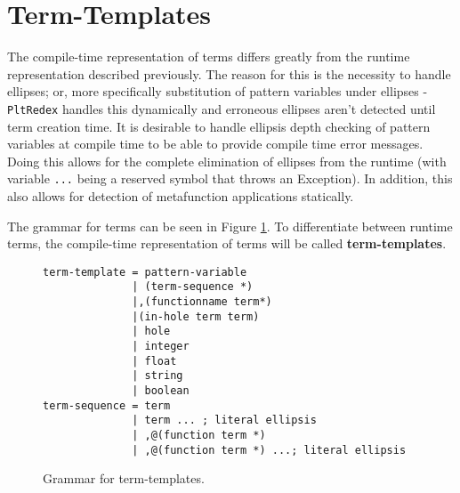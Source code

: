 \section{Term-Templates}
\label{section:term-templates}

The compile-time representation of terms differs greatly from the runtime representation described previously. The reason for this is the necessity to handle ellipses; or, more specifically substitution of pattern variables under ellipses - \texttt{PltRedex} handles this dynamically and erroneous ellipses aren't detected until term creation time.
It is desirable to handle ellipsis depth checking of pattern variables at compile time to be able to provide compile time error messages. Doing this allows for the complete elimination of ellipses from the runtime (with variable \texttt{...} being a reserved symbol that throws an Exception). In addition, this also allows for detection of metafunction applications statically.

The grammar for terms can be seen in Figure \ref{termtemplate-grammar}. To differentiate between runtime terms, the compile-time representation of terms will be called \textbf{term-templates}.

\begin{figure}
\begin{verbatim}
term-template = pattern-variable 
              | (term-sequence *)
              |,(functionname term*) 
              |(in-hole term term)
              | hole
              | integer
              | float
              | string
              | boolean 
term-sequence = term
              | term ... ; literal ellipsis
              | ,@(function term *)
              | ,@(function term *) ...; literal ellipsis 
\end{verbatim}
\caption{Grammar for term-templates.}
\label{termtemplate-grammar}
\end{figure}

